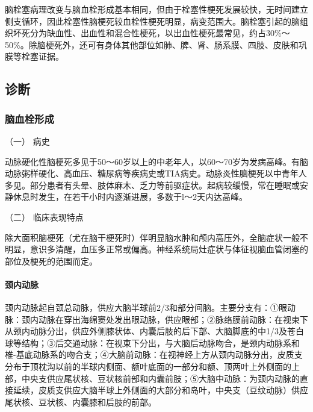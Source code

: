 脑栓塞病理改变与脑血栓形成基本相同，但由于栓塞性梗死发展较快，无时间建立侧支循环，因此栓塞性脑梗死较血栓性梗死明显，病变范围大。脑栓塞引起的脑组织坏死分为缺血性、出血性和混合性梗死，以出血性梗死最常见，约占30\%～50\%。除脑梗死外，还可有身体其他部位如肺、脾、肾、肠系膜、四肢、皮肤和巩膜等栓塞证据。

\subsection{诊断}

\subsubsection{脑血栓形成}

\hypertarget{text00242.htmlux5cux23CHP8-1-2-2-1-1}{}
（一） 病史

动脉硬化性脑梗死多见于50～60岁以上的中老年人，以60～70岁为发病高峰。有脑动脉粥样硬化、高血压、糖尿病等疾病史或TIA病史。动脉炎性脑梗死以中青年人多见。部分患者有头晕、肢体麻木、乏力等前驱症状。起病较缓慢，常在睡眠或安静休息时发生，在若干小时内逐渐进展，多数于l～2天内达高峰。

\hypertarget{text00242.htmlux5cux23CHP8-1-2-2-1-2}{}
（二） 临床表现特点

除大面积脑梗死（尤在脑干梗死时）伴明显脑水肿和颅内高压外，全脑症状一般不明显，意识多清醒，血压多正常或偏高。神经系统局灶症状与体征视脑血管闭塞的部位及梗死的范围而定。

\paragraph{颈内动脉}

颈内动脉起自颈总动脉，供应大脑半球前2/3和部分间脑。主要分支有：①眼动脉：颈内动脉在穿出海绵窦处发出眼动脉，供应眼部；②脉络膜前动脉：在视束下从颈内动脉分出，供应外侧膝状体、内囊后肢的后下部、大脑脚底的中1/3及苍白球等结构；③后交通动脉：在视束下分出，与大脑后动脉吻合，是颈内动脉系和椎-基底动脉系的吻合支；④大脑前动脉：在视神经上方从颈内动脉分出，皮质支分布于顶枕沟以前的半球内侧面、额叶底面的一部分和额、顶两叶上外侧面的上部，中央支供应尾状核、豆状核前部和内囊前肢；⑤大脑中动脉：为颈内动脉的直接延续，皮质支供应大脑半球上外侧面的大部分和岛叶，中央支（豆纹动脉）供应尾状核、豆状核、内囊膝和后肢的前部。

